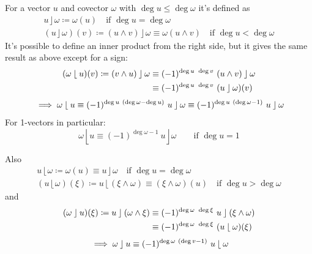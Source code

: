 \documentclass[\ifafour a4paper,12pt,\else a5paper,10pt,\fi%
onecolumn,oneside,article,%
british%
]{memoir}
\theoremstyle{remark}
\theoremstyle{innote}
\newcommand*{\defd}{\coloneqq}
\renewcommand*{\le}{\leqslant}%
\renewcommand*{\|}[1][]{\nonscript\:#1\vert\nonscript\:\mathopen{}}
\newcommand*{\ii}{\mathbin{\rfloor}}
\newcommand*{\rii}{\mathbin{\lfloor}}
\begin{document}
For a vector $u$ and covector $\omega$ with $\deg u \le \deg\omega$ it's
defined as
\begin{equation}
  \label{eq:inner_prod}
  \begin{gathered}
    u \ii \omega \defd \omega(u) \quad\text{if } \deg u=\deg\omega
\\
(u \ii \omega)(v) \defd (u\land v)\ii \omega \equiv \omega(u \land v)
 \quad\text{if } \deg u < \deg\omega
  \end{gathered}
\end{equation}
It's possible to define an inner product from the right side, but it gives
the same result as above except for a sign:
\begin{equation}
  \label{eq:right_inner_prod}
\begin{gathered}
  \begin{aligned}
  (\omega \rii u)(v) \defd (v\land u)\ii \omega
  &\equiv (-1)^{\deg u\ \deg v}\ (u\land v)\ii \omega
  \\&\equiv (-1)^{\deg u\ \deg v}\ (u \ii \omega)(v)
  \end{aligned}
  \\[\jot]
  {}\implies
\omega \rii u \equiv (-1)^{\deg u\ (\deg\omega-\deg u)}\ 
u \ii \omega \equiv (-1)^{\deg u\ (\deg\omega-1)}\ 
u \ii \omega
\end{gathered}
\end{equation}
For 1-vectors in particular:
\begin{equation}
  \label{eq:right_inner_equiv_1vector}
  \omega \rii u \equiv (-1)^{\deg\omega-1}\ 
  u \ii \omega
  \qquad\text{if }\deg u = 1
\end{equation}

Also
\begin{equation}
  \label{eq:ext_inner_prod}
  \begin{gathered}
    u \rii \omega \defd \omega(u) \equiv u \ii \omega \quad\text{if } \deg u=\deg\omega
\\
(u \rii \omega)(\xi) \defd u\rii(\xi\land \omega) \equiv (\xi\land\omega)(u)
\quad\text{if } \deg u > \deg\omega
\end{gathered}
\end{equation}
and
\begin{equation}
  \label{eq:ext_right_inner_prod}
\begin{gathered}
  \begin{aligned}
    (\omega\ii u)(\xi) \defd
    u\ii (\omega \land \xi)
  &\equiv (-1)^{\deg \omega\ \deg \xi}\ u\ii (\xi \land \omega)
  \\&\equiv (-1)^{\deg \omega\ \deg \xi}\ (u \rii \omega)(\xi)
  \end{aligned}
  \\[\jot]
  {}\implies
  \omega\ii u \equiv (-1)^{\deg \omega\ (\deg v-1)}\ 
u \rii \omega
\end{gathered}
\end{equation}
\end{document}
